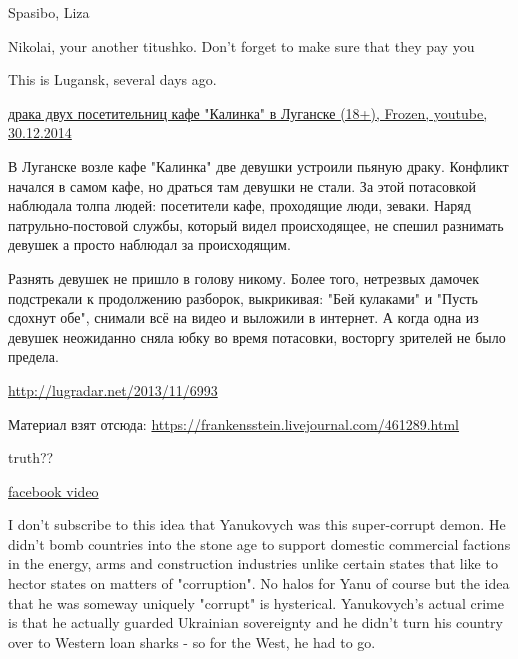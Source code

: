 \begin{itemize}
\begin{itemize}
Spasibo, Liza

Nikolai, your another titushko. Don't forget to make sure that they pay you

This is Lugansk, several days ago.

\href{http://youtu.be/I0EX_uVUf1U}{%
драка двух посетительниц кафе "Калинка" в Луганске (18+), Frozen, youtube, 30.12.2014%
}

В Луганске возле кафе "Калинка" две девушки устроили пьяную драку. Конфликт
начался в самом кафе, но драться там девушки не стали.  За этой потасовкой
наблюдала толпа людей: посетители кафе, проходящие люди, зеваки. Наряд
патрульно-постовой службы, который видел происходящее,  не спешил разнимать
девушек а просто наблюдал за происходящим.

Разнять девушек не пришло в голову никому. Более того, нетрезвых дамочек
подстрекали к продолжению разборок, выкрикивая: "Бей кулаками" и "Пусть сдохнут
обе", снимали всё на видео и выложили в интернет. А когда одна из девушек
неожиданно сняла юбку во время потасовки, восторгу зрителей не было предела.

\url{http://lugradar.net/2013/11/6993}

Материал взят отсюда: \url{https://frankensstein.livejournal.com/461289.html}

truth?? 

\href{https://www.facebook.com/video.php?v=754199491361130}{facebook video}


\end{itemize} %


I don't subscribe to this idea that Yanukovych was this super-corrupt demon. He
didn't bomb countries into the stone age to support domestic commercial
factions in the energy, arms and construction industries unlike certain states
that like to hector states on matters of "corruption". No halos for Yanu of
course but the idea that he was someway uniquely "corrupt" is hysterical.
Yanukovych's actual crime is that he actually guarded Ukrainian sovereignty and
he didn't turn his country over to Western loan sharks - so for the West, he
had to go.

\begin{itemize} %


\end{itemize}
\end{itemize}
